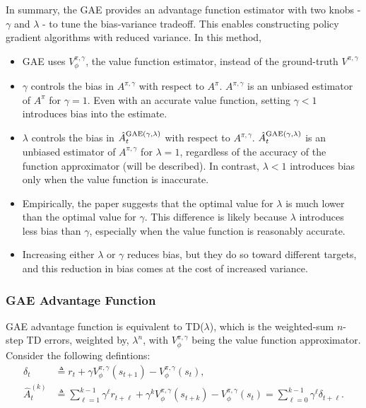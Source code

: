 \documentclass{article}
\begin{document}
In summary, the GAE provides an advantage function estimator with two knobs - $\gamma$ and $\lambda$ - to tune the bias-variance tradeoff. This enables constructing policy gradient algorithms with reduced variance.
In this method,
\begin{itemize}
    \item GAE uses $V_\phi^{\pi, \gamma}$, the value function estimator, instead of the ground-truth $V^{\pi,\gamma}$
    \item $\gamma$ controls the bias in $A^{\pi, \gamma}$ with respect to $A^\pi$. $A^{\pi, \gamma}$ is an unbiased estimator of $A^\pi$ for $\gamma =1$. Even with an accurate value function, setting $\gamma < 1$ introduces bias into the estimate. 
    \item $\lambda$ controls the bias in $\hat A_t^{\rm{GAE}(\gamma, \lambda)}$ with respect to $A^{\pi, \gamma}$. $\hat A_t^{\rm{GAE}(\gamma, \lambda)}$ is an unbiased estimator of $A^{\pi, \gamma}$ for $\lambda = 1$, regardless of the accuracy of the function approximator (will be described). In contrast, $\lambda < 1$ introduces bias only when the value function is inaccurate.
    \item Empirically, the paper suggests that the optimal value for $\lambda$ is much lower than the optimal value for $\gamma$. This difference is likely because $\lambda$ introduces less bias than $\gamma$, especially when the value function is reasonably accurate.
    \item Increasing either $\lambda$ or $\gamma$ reduces bias, but they do so toward different targets, and this reduction in bias comes at the cost of increased variance.
\end{itemize}

\subsubsection{GAE Advantage Function}

GAE advantage function is equivalent to TD($\lambda$), which is the weighted-sum $n$-step TD errors, weighted by, $\lambda^n$, with $V_\phi^{\pi, \gamma}$ being the value function approximator. Consider the following defintions:
\begin{align*}
    \delta_t &\triangleq r_t + \gamma V_\phi^{\pi, \gamma}(s_{t+1}) - V_\phi^{\pi, \gamma}(s_t),\\
    \hat A_t^{(k)} &\triangleq \sum_{\ell=1}^{k-1} \gamma^{\ell} r_{t+\ell} + \gamma^k V_\phi^{\pi, \gamma}(s_{t+k}) - V_\phi^{\pi, \gamma}(s_t) = \sum_{\ell =0}^{k-1} \gamma^\ell \delta_{t+\ell}.\\
\end{align*}
\end{document}
